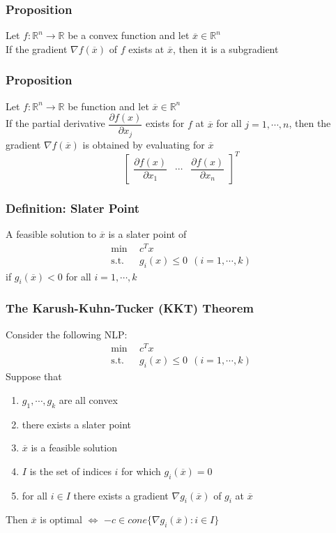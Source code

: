 \documentclass[11pt]{article}
\newcommand{\R}{{\mathbb{R}}}
\newcommand{\cv}[1]{\begin{bmatrix} #1 \end{bmatrix}}
\begin{document}
\subsubsection{Proposition}
Let $f:\R^n\rightarrow\R$ be a convex function and let $\overline{x}\in\R^n$ \\
If the gradient $\nabla f(\overline{x})$ of $f$ exists at $\overline{x}$, then it is a subgradient 
\subsubsection{Proposition}
Let $f:\R^n\rightarrow\R$ be function and let $\overline{x}\in\R^n$ \\
If the partial derivative $\dfrac{\partial f(x)}{\partial x_j}$ exists for $f$ at $\overline{x}$ for all $j=1,\cdots,n$, then 
the gradient $\nabla f(\overline{x})$ is obtained by evaluating for $\overline{x}$ 
\[\cv{\dfrac{\partial f(x)}{\partial x_1} &\cdots &\dfrac{\partial f(x)}{\partial x_n}}^T\]
\subsubsection{Definition: Slater Point}
A feasible solution to $\overline{x}$ is a slater point of 
\begin{align*}
  \text{min}\ \ &c^Tx \\
  \text{s.t.}\ \ &g_i(x)\leq 0 \ \ (i=1,\cdots,k)
\end{align*}
if $g_i(\overline{x})<0$ for all $i=1,\cdots,k$ 
\subsubsection{The Karush-Kuhn-Tucker (KKT) Theorem}
Consider the following NLP:
\begin{align*}
  \text{min}\ \ &c^Tx \\
  \text{s.t.}\ \ &g_i(x)\leq 0 \ \ (i=1,\cdots,k)
\end{align*}
Suppose that 
\begin{enumerate}
  \item $g_1,\cdots,g_k$ are all convex 
  \item there exists a slater point 
  \item $\overline{x}$ is a feasible solution 
  \item $I$ is the set of indices $i$ for which $g_i(\overline{x}) = 0$
  \item for all $i\in I$ there exists a gradient $\nabla g_i(\overline{x})$ of $g_i$ at $\overline{x}$
\end{enumerate}
Then $\overline{x}$ is optimal $\iff$ $-c\in cone\{\nabla g_i(\overline{x}):i\in I\}$
\end{document}
